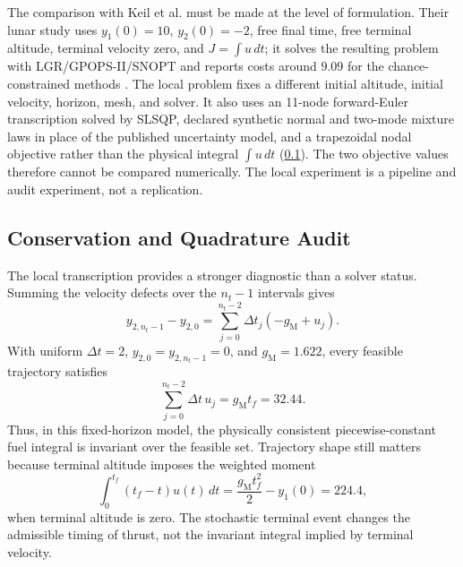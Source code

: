 The comparison with Keil et al. must be made at the level of formulation. Their lunar study uses $y_1(0)=10$, $y_2(0)=-2$, free final time, free terminal altitude, terminal velocity zero, and $J=\int u\,dt$; it solves the resulting problem with LGR/GPOPS-II/SNOPT and reports costs around $9.09$ for the chance-constrained methods \citep{keil2020,keil2021}. The local problem fixes a different initial altitude, initial velocity, horizon, mesh, and solver. It also uses an 11-node forward-Euler transcription solved by SLSQP, declared synthetic normal and two-mode mixture laws in place of the published uncertainty model, and a trapezoidal nodal objective rather than the physical integral $\int u\,dt$ (\cref{sec:quadrature-audit}). The two objective values therefore cannot be compared numerically. The local experiment is a pipeline and audit experiment, not a replication.

\subsection{Conservation and Quadrature Audit}
\label{sec:quadrature-audit}

The local transcription provides a stronger diagnostic than a solver status. Summing the velocity defects over the $n_t-1$ intervals gives
\begin{equation}
  y_{2,n_t-1}-y_{2,0}=\sum_{j=0}^{n_t-2}\Delta t_j(-g_{\mathrm M}+u_j).
 \label{eq:velocity-telescope}
\end{equation}
With uniform $\Delta t=2$, $y_{2,0}=y_{2,n_t-1}=0$, and $g_{\mathrm M}=1.622$, every feasible trajectory satisfies
\begin{equation}
 \sum_{j=0}^{n_t-2}\Delta t\, u_j=g_{\mathrm M} t_f=32.44.
 \label{eq:fuel-invariant}
\end{equation}
Thus, in this fixed-horizon model, the physically consistent piecewise-constant fuel integral is invariant over the feasible set. Trajectory shape still matters because terminal altitude imposes the weighted moment
\begin{equation}
 \int_0^{t_f}(t_f-t)u(t)\,dt
 =\frac{g_{\mathrm M} t_f^2}{2}-y_1(0)=224.4,
 \label{eq:altitude-moment}
\end{equation}
when terminal altitude is zero. The stochastic terminal event changes the admissible timing of thrust, not the invariant integral implied by terminal velocity.

